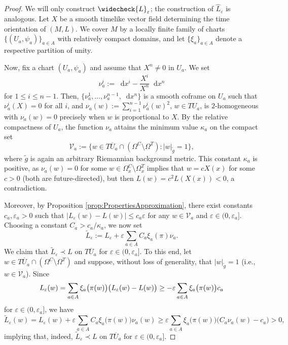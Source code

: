 \documentclass[a4paper,11pt]{article}
\numberwithin{equation}{section}
\theoremstyle{definition}
\theoremstyle{plain}
\newcommand{\eps}{\varepsilon}
\newcommand*\diff{\mathop{}\!\mathrm{d}}
\begin{document}
\begin{proof}
We will only construct $\widecheck{L}_\eps$; the construction of $\widehat{L}_\eps$ is analogous.
Let $X$ be a smooth timelike vector field determining the time orientation of $(M,L)$. We cover $M$ by a locally finite family of charts $\{(U_a, \psi_a)\}_{a \in A}$ with relatively compact domains, and let $\{\xi_a\}_{a \in A}$ denote a respective partition of unity.

Now, fix a chart $(U_a,\psi_a)$ and assume that $X^n \neq 0$ in $U_a$. 
We set
\begin{equation*}
    \nu_a^{i} :=\diff x^{i} - \frac{X^{i}}{X^n} \diff x^{n}
\end{equation*}
for $1 \leq i \leq n-1$.
Then, $\{\nu^1_a, \dots, \nu^{n-1}_a, \diff x^n\}$ is a smooth coframe on $U_a$ such that $\nu^i_{a}(X) = 0$ for all $i$, and $\nu_a(w):=\sum_{i=1}^{n-1} \nu_a^i (w)^2$, $w \in TU_a$, is $2$-homogeneous with $\nu_{a}(w)=0$ precisely when $w$ is proportional to $X$.
By the relative compactness of $U_a$, the function $\nu_a$ attains the minimum value $\kappa_a$ on the compact set 
\begin{equation*}
    \mathcal{V}_a:=\{w \in T\overline{U}\!_a  \cap (\Omega^C \setminus \Omega^T): |w|_{\tilde g} = 1\},
\end{equation*}
where $\tilde g$ is again an arbitrary Riemannian background metric.
This constant $\kappa_a$ is positive, as $\nu_a(w) = 0$ for some $w \in \Omega_x^C \setminus \Omega_x^T$ implies that $w = c X(x)$ for some $c >0$ (both are future-directed), but then $L(w) = c^2 L(X(x)) < 0$, a contradiction.

Moreover, by Proposition \ref{prop:PropertiesApproximation}, there exist constants $c_a,\eps_a>0$ such that $|L_\eps(w) - L(w)| \leq c_a \eps$ for any $w \in \mathcal{V}_a$ and $\eps \in (0,\eps_a]$.
Choosing a constant $C_a > c_a/\kappa_a$, we now set
\begin{equation*}
    \widetilde{L}_\eps := L_\eps + \eps \sum_{a \in A} C_a\xi_a(\pi) \nu_{a}.
\end{equation*}
We claim that $\widetilde{L}_\eps \prec L$ on $T \overline{U}\!_a$ for $\eps \in (0, \eps_a]$. 
To this end, let $w \in T \overline{U}\!_a \cap (\Omega^C \setminus \Omega ^T)$ and suppose, without loss of generality, that $|w|_{\tilde g} = 1$ (i.e., $w \in \mathcal{V}_a$).
Since
\begin{equation*}
    L_\eps(w) = \sum_{a \in A} \xi_a \bigl( \pi(w) \bigr) \bigl( L_\eps(w) - L(w)\bigr) \\
    \geq - \eps \sum_{a \in A} \xi_a \bigl( \pi(w) \bigr)c_a
\end{equation*}
for $\eps \in (0, \eps_a]$, we have
\begin{equation*}
    \widetilde{L}_\eps(w) = L_\eps(w) + \eps \sum_{a \in A} C_a\xi_a \bigl(\pi(w) \bigr) \nu_a(w) \geq \eps \sum_{a \in A} \xi_a \bigl(\pi(w)\bigr) \bigl(C_a\nu_a(w) - c_a \bigr) > 0,
\end{equation*}
implying that, indeed, $\widetilde{L}_\eps \prec L$ on $T \overline{U}\!_a$ for $\eps \in (0, \eps_a]$.


\end{proof}
\end{document}
